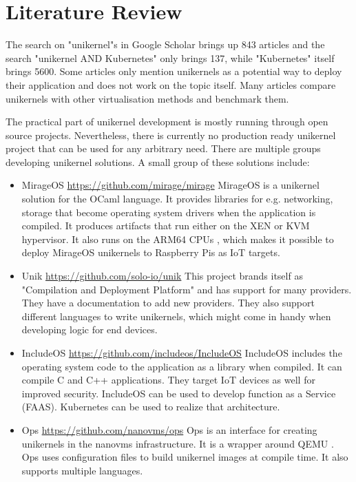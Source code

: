 
\chapter{Literature Review}\label{chapter:literature}
 The search on "unikernel"s in Google Scholar brings up 843 articles and the search "unikernel AND Kubernetes" only brings 137, while "Kubernetes" itself brings 5600. Some articles only mention unikernels as a potential way to deploy their application and does not work on the topic itself. Many articles compare unikernels with other virtualisation methods and benchmark them.
 
The practical part of unikernel development is mostly running through open source projects. Nevertheless, there is currently no production ready unikernel project that can be used for any arbitrary need. There are multiple groups developing unikernel solutions. A small group of these solutions include: 
\begin{itemize}
  \item MirageOS \url{https://github.com/mirage/mirage} \cite{madhavapeddy2014unikernels}
  MirageOS is a unikernel solution for the OCaml language. It provides libraries for e.g. networking, storage that become operating system drivers when the application is compiled. It produces artifacts that run either on the XEN or KVM hypervisor. It also runs on the ARM64 CPUs , which makes it possible to deploy MirageOS unikernels to Raspberry Pis as IoT targets. 
  \item Unik \url{https://github.com/solo-io/unik}\cite{levine2016unik} This project brands itself as "Compilation and Deployment Platform" and has support for many providers. They have a documentation to add new providers. They also support different languages to write unikernels, which might come in handy when developing logic for end devices.
  \item IncludeOS \url{https://github.com/includeos/IncludeOS} \cite{7396164}
  IncludeOS includes the operating system code to the application as a library when compiled. It can compile C and C++ applications. They target IoT devices as well for improved security. IncludeOS can be used to develop function as a Service (FAAS). Kubernetes can be used to realize that architecture.
  \item Ops \url{https://github.com/nanovms/ops}
  Ops is an interface for creating unikernels in the nanovms infrastructure. \cite{nanovms} It is a wrapper around QEMU \cite{qemu}. Ops uses configuration files to build unikernel images at compile time. It also supports multiple languages.
\end{itemize}

